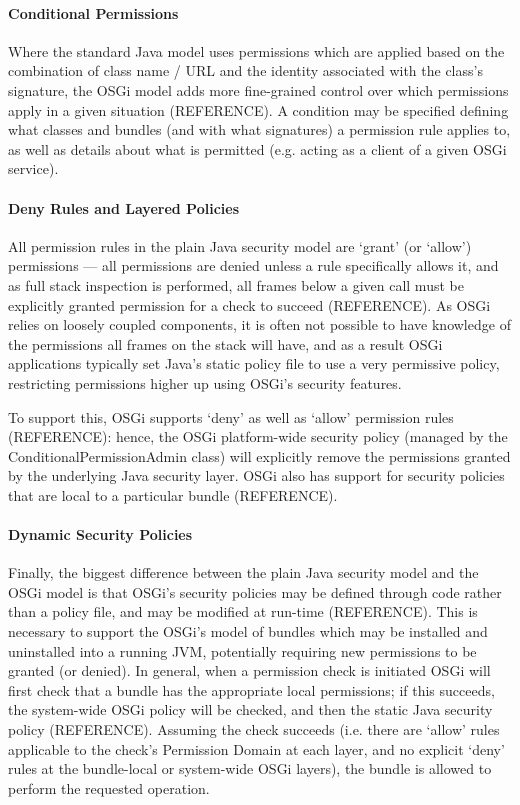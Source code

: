 \paragraph{Conditional Permissions}

Where the standard Java model uses permissions which are applied based on the combination of class name / URL and the identity associated with the class's signature, the OSGi model adds more fine-grained control over which permissions apply in a given situation (REFERENCE). A condition may be specified defining what classes and bundles (and with what signatures) a permission rule applies to, as well as details about what is permitted (e.g. acting as a client of a given OSGi service).

\paragraph{Deny Rules and Layered Policies}

All permission rules in the plain Java security model are `grant' (or `allow') permissions --- all permissions are denied unless a rule specifically allows it, and as full stack inspection is performed, all frames below a given call must be explicitly granted permission for a check to succeed (REFERENCE). As OSGi relies on loosely coupled components, it is often not possible to have knowledge of the permissions all frames on the stack will have, and as a result OSGi applications typically set Java's static policy file to use a very permissive policy, restricting permissions higher up using OSGi's security features.

To support this, OSGi supports `deny' as well as `allow' permission rules (REFERENCE): hence, the OSGi platform-wide security policy (managed by the ConditionalPermissionAdmin class) will explicitly remove the permissions granted by the underlying Java security layer. OSGi also has support for security policies that are local to a particular bundle (REFERENCE).

\paragraph{Dynamic Security Policies}

Finally, the biggest difference between the plain Java security model and the OSGi model is that OSGi's security policies may be defined through code rather than a policy file, and may be modified at run-time (REFERENCE). This is necessary to support the OSGi's model of bundles which may be installed and uninstalled into a running JVM, potentially requiring new permissions to be granted (or denied). In general, when a permission check is initiated OSGi will first check that a bundle has the appropriate local permissions; if this succeeds, the system-wide OSGi policy will be checked, and then the static Java security policy (REFERENCE). Assuming the check succeeds (i.e. there are `allow' rules applicable to the check's Permission Domain at each layer, and no explicit `deny' rules at the bundle-local or system-wide OSGi layers), the bundle is allowed to perform the requested operation.

\cite{philippov2012security}